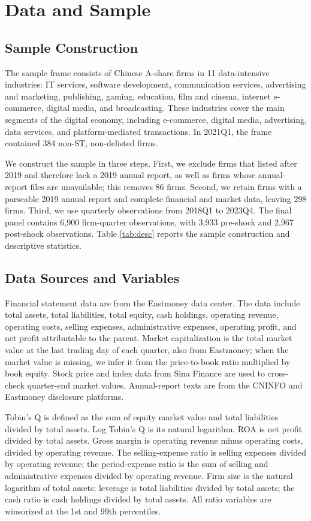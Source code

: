 \section{Data and Sample}
\label{sec:data}

\subsection{Sample Construction}

The sample frame consists of Chinese A-share firms in 11 data-intensive industries: IT services, software development, communication services, advertising and marketing, publishing, gaming, education, film and cinema, internet e-commerce, digital media, and broadcasting. These industries cover the main segments of the digital economy, including e-commerce, digital media, advertising, data services, and platform-mediated transactions. In 2021Q1, the frame contained 384 non-ST, non-delisted firms.

We construct the sample in three steps. First, we exclude firms that listed after 2019 and therefore lack a 2019 annual report, as well as firms whose annual-report files are unavailable; this removes 86 firms. Second, we retain firms with a parseable 2019 annual report and complete financial and market data, leaving 298 firms. Third, we use quarterly observations from 2018Q1 to 2023Q4. The final panel contains 6,900 firm-quarter observations, with 3,933 pre-shock and 2,967 post-shock observations. Table \ref{tab:desc} reports the sample construction and descriptive statistics.

\subsection{Data Sources and Variables}

Financial statement data are from the Eastmoney data center. The data include total assets, total liabilities, total equity, cash holdings, operating revenue, operating costs, selling expenses, administrative expenses, operating profit, and net profit attributable to the parent. Market capitalization is the total market value at the last trading day of each quarter, also from Eastmoney; when the market value is missing, we infer it from the price-to-book ratio multiplied by book equity. Stock price and index data from Sina Finance are used to cross-check quarter-end market values. Annual-report texts are from the CNINFO and Eastmoney disclosure platforms.

Tobin's Q is defined as the sum of equity market value and total liabilities divided by total assets. Log Tobin's Q is its natural logarithm. ROA is net profit divided by total assets. Gross margin is operating revenue minus operating costs, divided by operating revenue. The selling-expense ratio is selling expenses divided by operating revenue; the period-expense ratio is the sum of selling and administrative expenses divided by operating revenue. Firm size is the natural logarithm of total assets; leverage is total liabilities divided by total assets; the cash ratio is cash holdings divided by total assets. All ratio variables are winsorized at the 1st and 99th percentiles.

